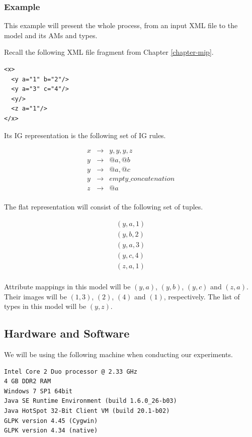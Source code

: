 \subsubsection{Example}

This example will present the whole process, from an input XML file to the model and its AMs and types.

Recall the following XML file fragment from Chapter \ref{chapter-mip}.
\begin{verbatim}
<x>
  <y a="1" b="2"/>
  <y a="3" c="4"/>
  <y/>
  <z a="1"/>
</x>
\end{verbatim}

Its IG representation is the following set of IG rules.

\begin{eqnarray*}
	x & \to & y, y, y, z \\
	y & \to & @a, @b \\
	y & \to & @a, @c \\
	y & \to & empty\_concatenation \\
	z & \to & @a \\
\end{eqnarray*}

The flat representation will consist of the following set of tuples.

\begin{eqnarray*}
(y, a, 1) \\
(y, b, 2) \\
(y, a, 3) \\
(y, c, 4) \\
(z, a, 1) \\
\end{eqnarray*}

Attribute mappings in this model will be $(y, a)$, $(y, b)$, $(y,c)$ and $(z,a)$. Their images will be $(1,3)$, $(2)$, $(4)$ and $(1)$, respectively. The list of types in this model will be $(y,z)$.

\subsection{Hardware and Software}

We will be using the following machine when conducting our experiments.

\begin{verbatim}
Intel Core 2 Duo processor @ 2.33 GHz
4 GB DDR2 RAM
Windows 7 SP1 64bit
Java SE Runtime Environment (build 1.6.0_26-b03)
Java HotSpot 32-Bit Client VM (build 20.1-b02)
GLPK version 4.45 (Cygwin)
GLPK version 4.34 (native)
\end{verbatim}

